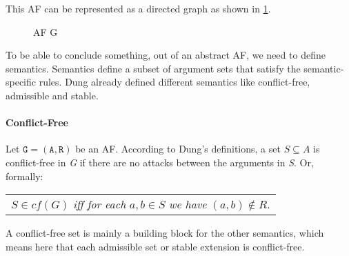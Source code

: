 This AF can be represented as a directed graph as shown in \cref{af:backgroundAFexample1}.
\begin{figure}[h]
    \centering
    \caption{\ac{AF} G}
    \label{af:backgroundAFexample1}
\end{figure}

To be able to conclude something, out of an abstract AF, we need to define semantics. Semantics define a subset of argument sets that satisfy the semantic-specific rules. Dung already defined different semantics \cite{Dung1995-DUNOTA-2} like conflict-free, admissible and stable.

\paragraph{Conflict-Free} Let $\mathtt{G=(A,R)}$ be an AF. According to Dung's definitions, a set $S \subseteq A$ is conflict-free in \textit{G} if there are no attacks between the arguments in \textit{S}. Or, formally:

\begin{center}
    \begin{tabular}{c}
        $S \in cf(G)$ \textit{iff for each} $a, b \in S$ \textit{we have} $(a, b) \not\in R$.
    \end{tabular}
\end{center}

A conflict-free set is mainly a building block for the other semantics, which means here that each admissible set or stable extension is conflict-free.

